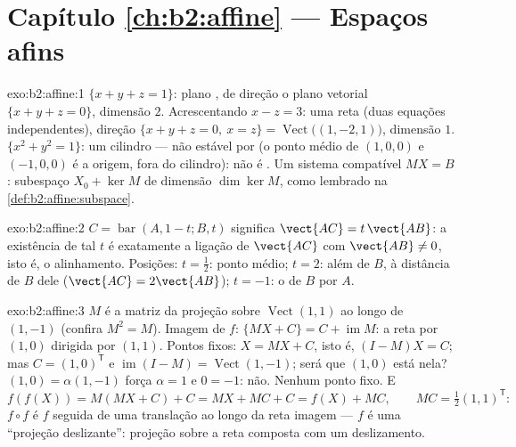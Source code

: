 \section*{Capítulo \ref{ch:b2:affine} --- Espaços afins}

\begin{solution}{exo:b2:affine:1}
$\{x + y + z = 1\}$: plano , de direção o plano vetorial $\{x
+ y + z = 0\}$, dimensão $2$. Acrescentando $x - z = 3$: uma reta 
(duas equações independentes), direção $\{x + y + z = 0,\ x = z\}
= \operatorname{Vect}\bigl((1, -2, 1)\bigr)$, dimensão $1$. $\{x^2
+ y^2 = 1\}$: um cilindro --- não estável por  (o
ponto médio de $(1,0,0)$ e $(-1,0,0)$ é a origem, fora do
cilindro): não é . Um sistema compatível $MX = B$: subespaço
 $X_0 + \ker M$ de dimensão $\dim\ker M$, como lembrado na
\cref{def:b2:affine:subspace}.
\end{solution}

\begin{solution}{exo:b2:affine:2}
$C = \operatorname{bar}(A, 1-t; B, t)$ significa $\vect{AC} =
t\,\vect{AB}$: a existência de tal $t$ é exatamente a ligação de
$\vect{AC}$ com $\vect{AB} \neq 0$, isto é, o alinhamento. Posições: $t
= \frac12$: ponto médio; $t = 2$: além de $B$, à distância de $B$ dele
($\vect{AC} = 2\vect{AB}$); $t = -1$: o  de $B$
por $A$.
\end{solution}

\begin{solution}{exo:b2:affine:3}
$M$ é a matriz da projeção sobre $\operatorname{Vect}(1,1)$ ao longo de
$(1,-1)$ (confira $M^2 = M$). Imagem de $f$: $\{MX + C\} = C +
\operatorname{im} M$: a reta  por $(1,0)$ dirigida por
$(1,1)$. Pontos fixos: $X = MX + C$, isto é, $(I - M)X = C$; mas $C =
(1, 0)^{\mathsf T}$ e $\operatorname{im}(I - M) =
\operatorname{Vect}(1,-1)$; será que $(1,0)$ está nela? $(1, 0) =
\alpha(1,-1)$ força $\alpha = 1$ e $0 = -1$: não. Nenhum ponto
fixo. E
\[
f(f(X)) = M(MX + C) + C = MX + MC + C = f(X) + MC,
\qquad MC = \tfrac12(1,1)^{\mathsf T} :
\]
$f\circ f$ é $f$ seguida de uma translação ao longo da reta imagem
--- $f$ é uma ``projeção deslizante'': projeção sobre a reta
composta com um deslizamento.
\end{solution}

